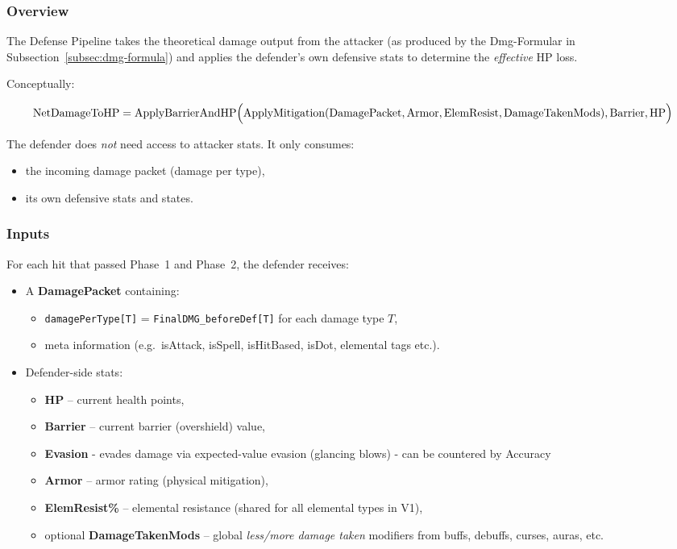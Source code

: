 \subsubsection{Overview}

The Defense Pipeline takes the theoretical damage output from the attacker
(as produced by the Dmg-Formular in Subsection~\ref{subsec:dmg-formula}) and
applies the defender's own defensive stats to determine the \emph{effective}
HP loss.

Conceptually:

\[
\text{NetDamageToHP} =
\text{ApplyBarrierAndHP}\Bigl(
\text{ApplyMitigation}(
\text{DamagePacket},
\text{Armor},
\text{ElemResist},
\text{DamageTakenMods}
),
\text{Barrier},
\text{HP}
\Bigr)
\]

The defender does \emph{not} need access to attacker stats. It only consumes:

\begin{itemize}
	\item the incoming damage packet (damage per type),
	\item its own defensive stats and states.
\end{itemize}

\subsubsection{Inputs}

For each hit that passed Phase~1 and Phase~2, the defender receives:

\begin{itemize}
	\item A \textbf{DamagePacket} containing:
	\begin{itemize}
		\item \texttt{damagePerType[T]} = \texttt{FinalDMG\_beforeDef[T]} for each damage type $T$,
		\item meta information (e.g.\ isAttack, isSpell, isHitBased, isDot, elemental tags etc.).
	\end{itemize}
	\item Defender-side stats:
	\begin{itemize}
		\item \textbf{HP} – current health points,
		\item \textbf{Barrier} – current barrier (overshield) value,
		\item \textbf{Evasion} - evades damage via expected-value evasion (glancing blows) - can be countered by Accuracy
		\item \textbf{Armor} – armor rating (physical mitigation),
		\item \textbf{ElemResist\%} – elemental resistance (shared for all elemental types in V1),
		\item optional \textbf{DamageTakenMods} – global \emph{less/more damage taken} modifiers
		from buffs, debuffs, curses, auras, etc.
	\end{itemize}
\end{itemize}

